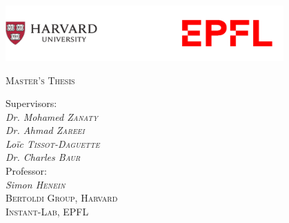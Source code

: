 \begin{titlepage}
    \makeatletter
	\centering

    \includegraphics[width=0.80\textwidth]{images/schools.png}
	
	\par\vspace{1cm}
	{\scshape\Large Master's Thesis \par}
	\vspace{1.5cm}
	

	{\huge\bfseries \@title \par}
	\vspace{2cm}
	{\Large\itshape \@author \par}
	\vspace{1cm}
	{\Large Supervisors: \itshape \\ Dr. Mohamed \textsc{Zanaty} \\ Dr. Ahmad \textsc{Zareei} \\ Loïc \textsc{Tissot-Daguette} \\ Dr. Charles \textsc{Baur} \\}
	\vspace{1cm}
	{\Large Professor: \\ \itshape Simon \textsc{Henein} \\}
	\vspace{1cm}
	{\Large \textsc{Bertoldi Group, Harvard \\  Instant-Lab,  EPFL}}
	
	\par
	\vfill
	{\scshape\large\@date}\\
	{\scshape\large}


\end{titlepage}

